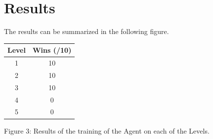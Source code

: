 \documentclass[11pt]{article}
\begin{document}
\section{Results}


The results can be summarized in the following figure. 


\begin{center}
 \begin{tabular}{||c c||} 
 \hline
 Level & Wins (/10) \\ [0.5ex] 
 \hline\hline
 1 & 10 \\ 
 \hline
 2 & 10 \\ 
 \hline
 3 & 10 \\ 
 \hline
 4 & 0 \\ 
 \hline
 5 & 0 \\ 
 \hline
\end{tabular} \newline \newline
Figure 3: Results of the training of the Agent on each of the Levels. 
\end{center}
\end{document}
